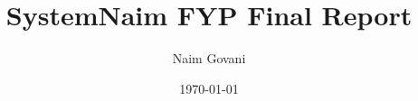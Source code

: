 \documentclass[a4paper, twoside]{report}
\begin{document}
    \setlength{\parskip}{4pt}
    \title{SystemNaim FYP Final Report}
    \author{Naim Govani}
    \date{\today}
    \maketitle

    \tableofcontents    
    
    
    
    
    
    
    
    
    
    

    \begin{appendices}
        
    \end{appendices}

\printbibliography
\end{document}
